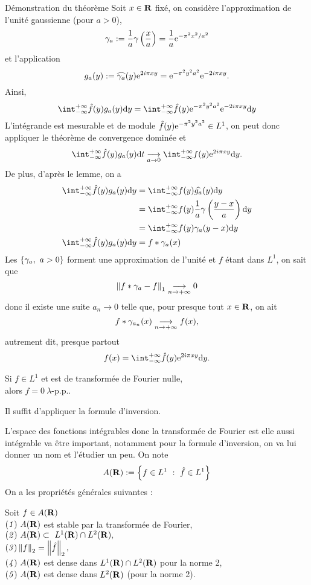 \documentclass[a4paper,11pt, twoside]{article}
\begin{document}
\begin{ProofC}{Démonstration du théorème}
  Soit $x\in\mathbf R$ fixé, on considère l'approximation de l'unité gaussienne (pour $a>0$), 
  $$\gamma_a:=\frac{1}{a}\gamma\left(\frac{x}{a}\right)=\frac{1}{a}\mathrm{e}^{-\pi^2 x^2/a^2}$$
  et l'application 
  $$g_a(y):=\widehat{\gamma_a}(y)\mathrm{e}^{2i\pi xy}=\mathrm{e}^{-\pi^2y^2a^2}\mathrm{e}^{-2i\pi xy}.$$
  Ainsi,
  $$\intr \hat f(y)g_a(y)\dy=\intr \hat f(y)\ex{-\pi^2y^2a^2}\ex{-2i\pi xy}\dy$$
  L'intégrande est mesurable et de module $\hat f(y)\mathrm{e}^{-\pi^2y^2a^2}\in L^1$, on peut donc appliquer le théorème de convergence dominée et 
  $$\intr \hat f(y)g_a(y)\dt\underset{a\to 0}{\longrightarrow} \intr f(y)\ex{2i\pi xy}\dy.$$
  De plus, d'après le lemme, on a 
  \begin{align*}
    \intr \hat f(y)g_a(y)\dy&=\intr f(y)\widehat{g_a}(y)\dy\\
    &=\intr f(y)\frac{1}{a}\gamma\Par{\frac{y-x}{a}}\dy\\
    &=\intr f(y)\gamma_a(y-x)\dy\\
    \intr \hat f(y)g_a(y)\dy&= f*\gamma_a(x)
  \end{align*}
  Les $\ens{\gamma_a,\ a>0}$ forment une approximation de l'unité et $f$ étant dans $L^1$, on sait que 
  $$\left\lVert f*\gamma_a-f\right\rVert_1\underset{n\to+\infty}{\longrightarrow} 0$$
  donc il existe une suite $a_n\longrightarrow 0$ telle que, pour presque tout $x\in \mathbf R$, on ait 
  $$f*\gamma_{a_n}(x)\underset{n\to+\infty}{\longrightarrow} f(x),$$
  autrement dit, presque partout
  $$f(x)=\intr \hat f(y)\ex{2i\pi xy}\dy.$$
\end{ProofC}


\begin{corollaire}
  Si $f\in L^1$ et est de transformée de Fourier nulle,\\

  alors $f=0\ \lambda$-p.p..
\end{corollaire}


\begin{Proof}
  Il suffit d'appliquer la formule d'inversion.
\end{Proof}




L'espace des fonctions intégrables donc la transformée de Fourier est elle aussi intégrable va être important, notamment pour la formule d'inversion, on va lui donner un nom et l'étudier un peu. On note 
$$A(\mathbf R):=\left\{f\in L^1\ :\ \hat f\in L^1\right\}$$
On a les propriétés générales suivantes : 


\begin{prop}
  Soit $f\in A(\mathbf R)$\\

  $(\mathit 1)\ A(\mathbf R)$ est stable par la transformée de Fourier,\\
  $(\mathit 2)\ A(\mathbf R)\subset\ L^1(\mathbf R)\cap L^2(\mathbf R),$\\
  $(\mathit 3)\left\lVert f\right\rVert_2=\left\lVert\hat f\right\rVert_2,$\\
  $(\mathit 4)\ A(\mathbf R)$ est dense dans $L^1(\mathbf R)\cap L^2(\mathbf R)$ pour la norme 2,\\
  $(\mathit 5)\ A(\mathbf R)$ est dense dans $L^2(\mathbf R)$ (pour la norme 2).
\end{prop}
\end{document}
